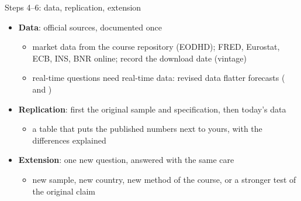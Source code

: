 \begin{frame}{Steps 4--6: data, replication, extension}
\itemsize{\small}
\begin{itemize}
    \item \textbf{Data}: official sources, documented once
    \begin{itemize}
        \item market data from the course repository (EODHD); FRED, Eurostat, ECB, INS, BNR online; record the download date (vintage)
        \item real-time questions need real-time data: revised data flatter forecasts ( and )
    \end{itemize}
    \item \textbf{Replication}: first the original sample and specification, then today's data
    \begin{itemize}
        \item a table that puts the published numbers next to yours, with the differences explained
    \end{itemize}
    \item \textbf{Extension}: one new question, answered with the same care
    \begin{itemize}
        \item new sample, new country, new method of the course, or a stronger test of the original claim
    \end{itemize}
\end{itemize}
\end{frame}

